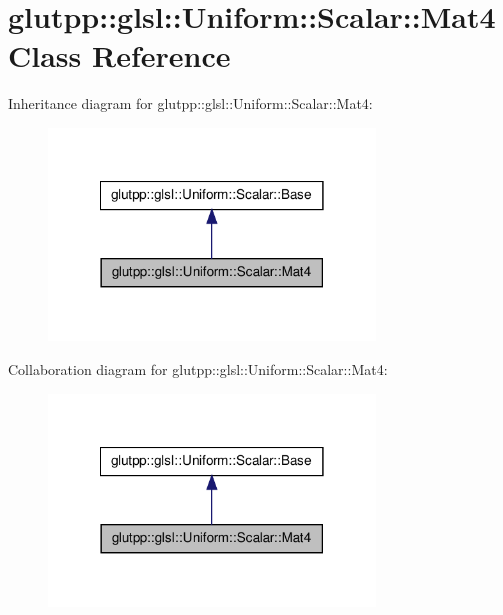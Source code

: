 \hypertarget{classglutpp_1_1glsl_1_1Uniform_1_1Scalar_1_1Mat4}{\section{glutpp\-:\-:glsl\-:\-:\-Uniform\-:\-:\-Scalar\-:\-:\-Mat4 \-Class \-Reference}
\label{classglutpp_1_1glsl_1_1Uniform_1_1Scalar_1_1Mat4}
}


\-Inheritance diagram for glutpp\-:\-:glsl\-:\-:\-Uniform\-:\-:\-Scalar\-:\-:\-Mat4\-:\nopagebreak
\begin{figure}[H]
\begin{center}
\leavevmode
\includegraphics[width=246pt]{classglutpp_1_1glsl_1_1Uniform_1_1Scalar_1_1Mat4__inherit__graph}
\end{center}
\end{figure}


\-Collaboration diagram for glutpp\-:\-:glsl\-:\-:\-Uniform\-:\-:\-Scalar\-:\-:\-Mat4\-:\nopagebreak
\begin{figure}[H]
\begin{center}
\leavevmode
\includegraphics[width=246pt]{classglutpp_1_1glsl_1_1Uniform_1_1Scalar_1_1Mat4__coll__graph}
\end{center}
\end{figure}
